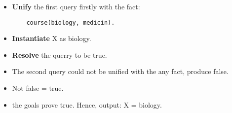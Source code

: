 \begin{itemize}
    \item \textbf{Unify} the first query firstly with the fact:
    \begin{lstlisting}
    course(biology, medicin).
    \end{lstlisting}
    \item \textbf{Instantiate} X as biology.
    \item \textbf{Resolve} the querry to be true.
    \item The second query could not be unified with the any fact, produce false. 
    \item Not false  = true.
    \item the goals prove true. Hence, output: X = biology.
\end{itemize}
\newpage
